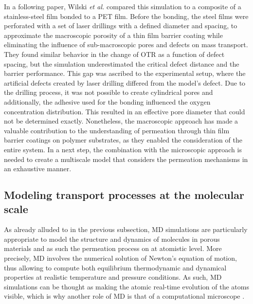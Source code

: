 \documentclass[AMA,STIX2COL]{WileyNJD-v2} %
\begin{document}
In a following paper, Wilski \textit{et al.} \cite{Wilski_2021} compared this simulation to a composite of a stainless-steel film bonded to a PET film. Before the bonding, the steel films were perforated with a set of laser drillings with a defined diameter and spacing, to approximate the macroscopic porosity of a thin film barrier coating while eliminating the influence of sub-macroscopic pores and defects on mass transport. They found similar behavior in the change of OTR as a function of defect spacing, but the simulation underestimated the critical defect distance and the barrier performance. This gap was ascribed to the experimental setup, where the artificial defects created by laser drilling differed from the model’s defect. Due to the drilling process, it was not possible to create cylindrical pores and additionally, the adhesive used for the bonding influenced the oxygen concentration distribution. This resulted in an effective pore diameter that could not be determined exactly. Nonetheless, the macroscopic approach has made a valuable contribution to the understanding of permeation through thin film barrier coatings on polymer substrates, as they enabled the consideration of the entire system. In a next step, the combination with the microscopic approach is needed to create a multiscale model that considers the permeation mechanisms in an exhaustive manner.\\

\subsection{Modeling transport processes at the molecular scale} \label{subsec23}

As already alluded to in the previous subsection, MD simulations are particularly appropriate to model the structure and dynamics of molecules in porous materials and as such the permeation process on at atomistic level. More precisely, MD involves the numerical solution of Newton’s equation of motion, thus allowing to compute both equilibrium thermodynamic and dynamical properties at realistic temperature and pressure conditions. As such, MD simulations can be thought as making the atomic real-time evolution of the atoms visible, which is why another role of MD is that of a computational microscope \cite{Kuehne2014}.
\end{document}
